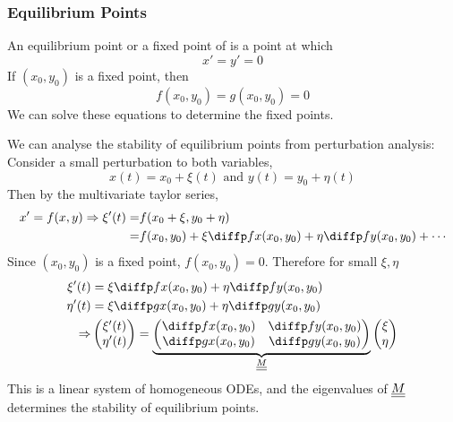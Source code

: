 \documentclass{article}
\begin{document}
\subsubsection{Equilibrium Points}
\begin{defi}
    An equilibrium point or a fixed point of  is a point at which
    \[
        x' = y' = 0  
    \]
    If $(x_0, y_0)$ is a fixed point, then
    \[
        f(x_0, y_0) = g(x_0, y_0) = 0  
    \]
    We can solve these equations to determine the fixed points.
\end{defi}

We can analyse the stability of equilibrium points from perturbation analysis:
Consider a small perturbation to both variables,
\[
    x(t) = x_0 + \xi (t) \text{ and } y(t) = y_0 + \eta (t)
\]
Then by the multivariate taylor series,
\begin{align*}
    x' = f(x, y) \Rightarrow \xi'(t) =& f(x_0 + \xi, y_0 + \eta) \\
    =& f(x_0, y_0) + \xi \diffp fx (x_0, y_0) + \eta \diffp fy (x_0, y_0) + \cdots
\end{align*}
Since $(x_0, y_0)$ is a fixed point, $f(x_0, y_0) = 0$. Therefore for small $\xi, \eta$
\begin{align*}
    \xi'(t) &= \xi \diffp fx (x_0, y_0) + \eta \diffp fy (x_0, y_0) \\
    \eta'(t) &= \xi \diffp gx (x_0, y_0) + \eta \diffp gy (x_0, y_0) \\
    \Rightarrow& \begin{pmatrix}
        \xi'(t) \\ \eta'(t)
    \end{pmatrix} = \underbrace{\begin{pmatrix}
        \diffp fx (x_0, y_0) & \diffp fy (x_0, y_0) \\
        \diffp gx (x_0, y_0) & \diffp gy (x_0, y_0)
    \end{pmatrix}}_{\dunder M} \begin{pmatrix}
        \xi \\ \eta
    \end{pmatrix}
\end{align*}
This is a linear system of homogeneous ODEs, and the eigenvalues of $\underline{\underline{M}}$ determines the stability of equilibrium points.
\end{document}
